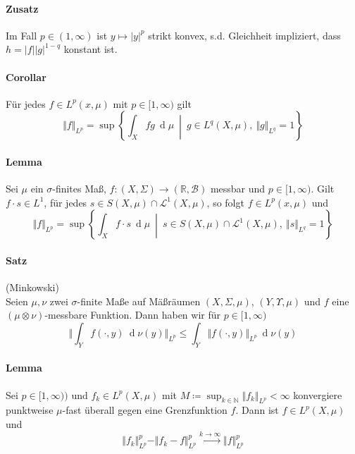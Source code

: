 \documentclass[12pt,a4paper,fleqn]{article}
\def\set#1{{\left\{ #1 \right\}}}
\def\Mid{\ \middle|\ }
\def\d{{\operatorname{d}}}
\begin{document}
\paragraph{Zusatz} Im Fall $p \in (1, \infty)$ ist $y \mapsto \vert y \vert^p$ strikt konvex, s.d. Gleichheit impliziert, dass $h = \vert f \vert \vert g \vert^{1 - q}$ konstant ist.

\paragraph{Corollar} Für jedes $f \in {L}^p(x, \mu)$ mit $p \in [1, \infty)$ gilt
\begin{displaymath}
\Vert f \Vert_{L^p} = \sup \set{ \int_X fg\ \d\mu \Mid g \in L^{q}(X, \mu),\ \Vert g \Vert_{L^{q}} = 1 }
\end{displaymath}

\paragraph{Lemma} Sei $\mu$ ein $\sigma$-finites Maß, $f\colon (X, \Sigma) \rightarrow (\mathbb{R}, \mathcal{B})$ messbar und $p \in [1, \infty)$. Gilt $f \cdot s \in {L}^1$, für jedes $s \in S(X, \mu) \cap \mathscr{L}^1(X, \mu)$, so folgt $f \in {L}^p(x, \mu)$ und 
\begin{displaymath}
\Vert f \Vert_{L^p} = \sup \set{ \int_X f \cdot s\ \d\mu \Mid s \in S(X, \mu) \cap \mathscr{L}^1(X, \mu),\ \Vert s \Vert_{L^{q}} = 1 }
\end{displaymath}

\paragraph{Satz} (Minkowski)\\
Seien $\mu, \nu$ zwei $\sigma$-finite Maße auf Mäßräumen $(X, \Sigma, \mu)$, $(Y, \Upsilon, \mu)$ und $f$ eine\linebreak \mbox{$(\mu \otimes \nu)$-messbare} Funktion. Dann haben wir für $p \in [1, \infty)$
\begin{displaymath}
\bigg \Vert \int_Y f(\cdot, y)\ \d\nu(y)\bigg\Vert_{L^p} \leq \int_Y \Vert f(\cdot, y) \Vert_{L^p} \ \d\nu(y)
\end{displaymath}

\paragraph{Lemma} Sei $p \in [1, \infty))$ und $f_k \in {L}^p(X, \mu)$ mit $M \coloneqq \sup_{k \in \mathbb{N}} \Vert f_k \Vert_{L^p} < \infty$ konvergiere punktweise $\mu$-fast überall gegen eine Grenzfunktion $f$. Dann ist $f \in {L}^p(X, \mu)$ und 
\begin{displaymath}
\Vert f_k \Vert^p_{L^p} - \Vert f_k - f \Vert^p_{L^p} \xrightarrow{k \rightarrow \infty} \Vert f \Vert^p_{L^p}
\end{displaymath}
\end{document}
